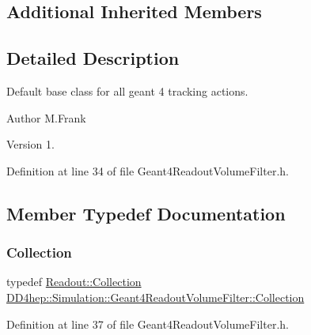 \subsection*{Additional Inherited Members}


\subsection{Detailed Description}
Default base class for all geant 4 tracking actions. 

\begin{DoxyAuthor}{Author}
M.\+Frank 
\end{DoxyAuthor}
\begin{DoxyVersion}{Version}
1. 
\end{DoxyVersion}


Definition at line 34 of file Geant4\+Readout\+Volume\+Filter.\+h.



\subsection{Member Typedef Documentation}
\hypertarget{class_d_d4hep_1_1_simulation_1_1_geant4_readout_volume_filter_a8a5e97e2736eb07d0d98f3300ca4b61d}{}\label{class_d_d4hep_1_1_simulation_1_1_geant4_readout_volume_filter_a8a5e97e2736eb07d0d98f3300ca4b61d} 
\subsubsection{\texorpdfstring{Collection}{Collection}}
{\footnotesize\ttfamily typedef \hyperlink{class_d_d4hep_1_1_geometry_1_1_readout_ac1c39a13ec9bd42d658319fa48cac81d}{Readout\+::\+Collection} \hyperlink{class_d_d4hep_1_1_simulation_1_1_geant4_readout_volume_filter_a8a5e97e2736eb07d0d98f3300ca4b61d}{D\+D4hep\+::\+Simulation\+::\+Geant4\+Readout\+Volume\+Filter\+::\+Collection}\hspace{0.3cm}{\ttfamily [private]}}



Definition at line 37 of file Geant4\+Readout\+Volume\+Filter.\+h.

\hypertarget{class_d_d4hep_1_1_simulation_1_1_geant4_readout_volume_filter_a6b5e464fd34617d118c15b917c9094fa}{}\label{class_d_d4hep_1_1_simulation_1_1_geant4_readout_volume_filter_a6b5e464fd34617d118c15b917c9094fa} 
